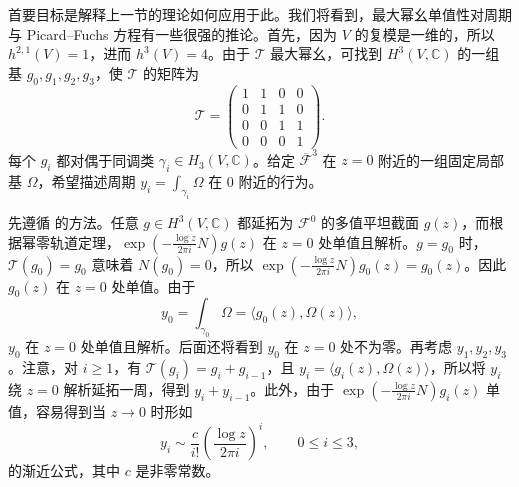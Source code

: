 首要目标是解释上一节的理论如何应用于此。我们将看到，最大幂幺单值性对周期与 Picard--Fuchs 方程有一些很强的推论。首先，因为 $V$ 的复模是一维的，所以 $h^{2,1}(V)=1$，进而 $h^3(V)=4$。由于 $\mathcal T$ 最大幂幺，可找到 $H^3(V,\mathbb C)$ 的一组基 $g_0,g_1,g_2,g_3$，使 $\mathcal T$ 的矩阵为
\begin{equation}\label{eq:mum-jordan-matrix}
\mathcal T=
\begin{pmatrix}
1&1&0&0\\
0&1&1&0\\
0&0&1&1\\
0&0&0&1
\end{pmatrix}.
\end{equation}
每个 $g_i$ 都对偶于同调类 $\gamma_i\in H_3(V,\mathbb C)$。给定 $\overline{\mathcal F}^3$ 在 $z=0$ 附近的一组固定局部基 $\Omega$，希望描述周期 $y_i=\int_{\gamma_i}\Omega$ 在 $0$ 附近的行为。

先遵循  的方法。任意 $g\in H^3(V,\mathbb C)$ 都延拓为 $\mathcal F^0$ 的多值平坦截面 $g(z)$，而根据幂零轨道定理，$\exp(-\tfrac{\log z}{2\pi i}N)g(z)$ 在 $z=0$ 处单值且解析。$g=g_0$ 时，$\mathcal T(g_0)=g_0$ 意味着 $N(g_0)=0$，所以 $\exp(-\tfrac{\log z}{2\pi i}N)g_0(z)=g_0(z)$。因此 $g_0(z)$ 在 $z=0$ 处单值。由于
\[
y_0=\int_{\gamma_0}\Omega=\langle g_0(z),\Omega(z)\rangle,
\]
$y_0$ 在 $z=0$ 处单值且解析。后面还将看到 $y_0$ 在 $z=0$ 处不为零。再考虑 $y_1,y_2,y_3$。注意，对 $i\geq1$，有 $\mathcal T(g_i)=g_i+g_{i-1}$，且 $y_i=\langle g_i(z),\Omega(z)\rangle$，所以将 $y_i$ 绕 $z=0$
解析延拓一周，得到 $y_i+y_{i-1}$。此外，由于 $\exp(-\tfrac{\log z}{2\pi i}N)g_i(z)$ 单值，容易得到当 $z\to0$ 时形如
\[
y_i\sim\frac c{i!}\left(\frac{\log z}{2\pi i}\right)^i,
\qquad0\leq i\leq3,
\]
的渐近公式，其中 $c$ 是非零常数。

